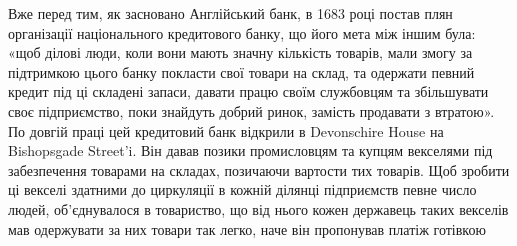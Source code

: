 Вже перед тим, як засновано Англійський банк, в 1683 році постав плян
організації національного кредитового банку, що його мета між іншим була:
«щоб ділові люди, коли вони мають значну кількість товарів, мали змогу за
підтримкою цього банку покласти свої товари на склад, та одержати певний
кредит під ці складені запаси, давати працю своїм службовцям та збільшувати
своє підприємство, поки знайдуть добрий ринок, замість продавати з втратою».
По довгій праці цей кредитовий банк відкрили в Devonschire House на Bishopsgade
Street'i. Він давав позики промисловцям та купцям векселями під забезпечення
товарами на складах, позичаючи  вартости тих товарів. Щоб зробити
ці векселі здатними до циркуляції в кожній ділянці підприємств певне число
людей, об’єднувалося в товариство, що від нього кожен державець таких векселів
мав одержувати за них товари так легко, наче він пропонував платіж готівкою
\parbreak{}  %
